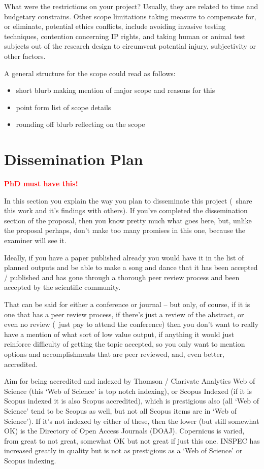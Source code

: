 What were the restrictions on your project?  Usually, they are related to time and budgetary constrains.  Other scope limitations taking measure to compensate for, or eliminate, potential ethics conflicts, include avoiding invasive testing techniques, contention concerning IP rights, and taking human or animal test subjects out of the research design to circumvent potential injury, subjectivity or other factors.

A general structure for the scope could read as follows:

\begin{itemize}
  \item short blurb making mention of major scope and reasons for this
  \item point form list of scope details
  \item rounding off blurb reflecting on the scope
\end{itemize}

\section{Dissemination Plan}

\textbf{\textcolor{red}{PhD must have this!}}

In this section you explain the way you plan to disseminate this project (\ie~share this work and it's findings with others). If you've completed the dissemination section of the proposal, then you know pretty much what goes here, but, unlike the proposal perhaps, don't make too many promises in this one, because the examiner will see it.

Ideally, if you have a paper published already you would have it in the list of planned outputs and be able to make a song and dance that it has been accepted / published and has gone through a thorough peer review process and been accepted by the scientific community.

That can be said for either a conference or journal -- but only, of course, if it is one that has a peer review process, if there's just a review of the abstract, or even no review (\ie~just pay to attend the conference) then you don't want to really have a mention of what sort of low value output, if anything it would just reinforce difficulty of getting the topic accepted, so you only want to mention options and accomplishments that are peer reviewed, and, even better, accredited.

Aim for being accredited and indexed by Thomson / Clarivate Analytics Web of Science (this `Web of Science' is top notch indexing), or Scopus Indexed (if it is Scopus indexed it is also Scopus accredited), which is prestigious also (all `Web of Science' tend to be Scopus as well, but not all Scopus items are in `Web of Science').  If it's not indexed by either of these, then the lower (but still somewhat OK) is the Directory of Open Access Journals (DOAJ). Copernicus is varied, from great to not great, somewhat OK but not great if just this one. INSPEC has increased greatly in quality but is not as prestigious as a `Web of Science' or Scopus indexing.

